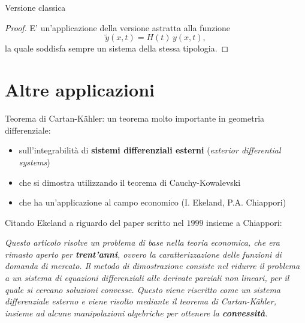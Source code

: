 Versione classica
\begin{theorem}
\end{theorem}


\begin{proof}
E' un'applicazione della versione astratta alla funzione $$\widetilde{y}(x,t) = H(t) \, y(x,t),$$ 
la quale soddisfa sempre un sistema della stessa tipologia.
\end{proof}

\newpage
\section{Altre applicazioni}

Teorema di Cartan-Kähler: un teorema molto importante in geometria differenziale:
\begin{itemize}
\item sull'integrabilità di \textbf{sistemi differenziali esterni} (\textit{exterior differential systems})
\item che si dimostra utilizzando il teorema di Cauchy-Kowalevski
\item che ha un'applicazione al campo economico (I. Ekeland, P.A. Chiappori)
\end{itemize}

Citando Ekeland a riguardo del paper scritto nel $1999$ insieme a Chiappori:\\
\begin{center}
\textit{Questo articolo risolve un problema di base nella teoria economica, che era rimasto aperto per \textbf{trent'anni}, ovvero la caratterizzazione delle funzioni di domanda di mercato. Il metodo di dimostrazione consiste nel ridurre il problema a un sistema di equazioni differenziali alle derivate parziali non lineari, per il quale si cercano soluzioni convesse. Questo viene riscritto come un sistema differenziale esterno e viene risolto mediante il teorema di Cartan-Kähler, insieme ad alcune manipolazioni algebriche per ottenere la \textbf{convessità}.}
\end{center}

